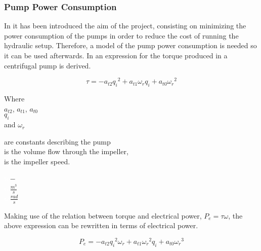 \subsubsection*{Pump Power Consumption}
In  it has been introduced the aim of the project, consisting on minimizing the power consumption of the pumps in order to reduce 
the cost of running the hydraulic setup. Therefore, a model of the pump power consumption is needed so it can be used afterwards. In \cite{Phd_Carsten} 
an expression for the torque produced in a centrifugal pump is derived. 

\begin{equation}
  \tau = -a_{t2}{q_i}^2 + a_{t1} {\omega}_r {q_i} + a_{t0} {{\omega}_r}^2
  \label{pumptorque}
\end{equation}

\begin{minipage}[t]{0.20\textwidth}
Where\\
\hspace*{8mm} $a_{t2}$, $a_{t1}$, $a_{t0}$ \\
\hspace*{8mm} $q_i$ \\
and \hspace*{0.7mm} $\omega_r$ 

\end{minipage}
\begin{minipage}[t]{0.68\textwidth}
\vspace*{2mm}
are constants describing the pump\\
is the volume flow through the impeller,\\
is the impeller speed.
\end{minipage}
\begin{minipage}[t]{0.10\textwidth}
\vspace*{2mm}
\textcolor{White}{te}$\unit{-}$\\
\textcolor{White}{te}$\unit{\frac{m^3}{s}}$\\
\textcolor{White}{te}$\unit{\frac{rad}{s}}$
\end{minipage}	

Making use of the relation between torque and electrical power, $P_e = \tau \omega$, the above expression can be rewritten in terms of electrical 
power. 

\begin{equation}
  P_e = -a_{t2}{q_i}^2{\omega}_r + a_{t1} {{\omega}_r}^2 {q_i} + a_{t0} {{\omega}_r}^3
  \label{pumptorque}
\end{equation}



